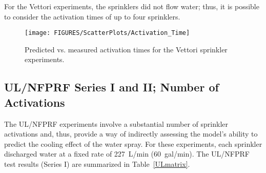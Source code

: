 For the Vettori experiments, the sprinklers did not flow water; thus, it is possible to consider the activation times of up to four sprinklers.

\begin{figure}[h]
\begin{center}
\texttt{[image: FIGURES/ScatterPlots/Activation\_Time]}
\end{center}
\caption[Activation times for the Vettori sprinkler experiments]{Predicted vs. measured activation times for the Vettori sprinkler experiments.}
\label{Sprinkler_Activation_Times}
\end{figure}


\clearpage

\subsection{UL/NFPRF Series I and II; Number of Activations}
\label{UL_NFPRF:Results}

The UL/NFPRF experiments involve a substantial number of sprinkler activations and, thus, provide a way of indirectly assessing the model's ability to predict the cooling effect of the water spray. For these experiments, each sprinkler discharged water at a fixed rate of 227~L/min (60~gal/min). 
The UL/NFPRF test results (Series I) are summarized in Table~\ref{ULmatrix}.

